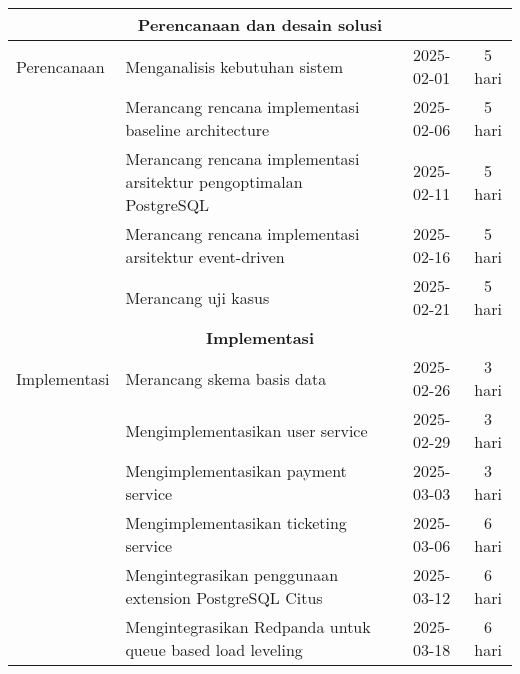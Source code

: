 \begin{center}
\begin{longtable}{|p{}|p{}|c|c|}
        \multicolumn{4}{|c|}{\textbf{Perencanaan dan desain solusi}}                                                                                       \\
        \hline
        Perencanaan             & Menganalisis kebutuhan sistem                                                 & 2025-02-01             & 5 hari          \\
                                & Merancang rencana implementasi baseline architecture                          & 2025-02-06             & 5 hari          \\
                                & Merancang rencana implementasi arsitektur pengoptimalan PostgreSQL            & 2025-02-11             & 5 hari          \\
                                & Merancang rencana implementasi arsitektur event-driven                        & 2025-02-16             & 5 hari          \\
                                & Merancang uji kasus                                                           & 2025-02-21             & 5 hari          \\
        \hline
        \multicolumn{4}{|c|}{\textbf{Implementasi}}                                                                                                        \\
        \hline
        Implementasi            & Merancang skema basis data                                                    & 2025-02-26             & 3 hari          \\
                                & Mengimplementasikan user service                                              & 2025-02-29             & 3 hari          \\
                                & Mengimplementasikan payment service                                           & 2025-03-03             & 3 hari          \\
                                & Mengimplementasikan ticketing service                                         & 2025-03-06             & 6 hari          \\
                                & Mengintegrasikan penggunaan extension PostgreSQL Citus                        & 2025-03-12             & 6 hari          \\
                                & Mengintegrasikan Redpanda untuk queue based load leveling                     & 2025-03-18             & 6 hari          \\

\end{longtable}
\end{center}
